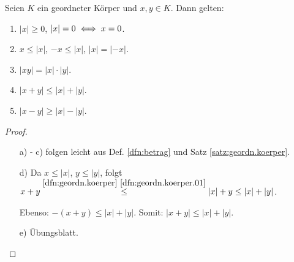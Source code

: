 \documentclass[12pt]{scrreprt}
\begin{document}
\begin{satz}\label{satz:betrag}
Seien $K$ ein geordneter Körper und $x, y \in K$. Dann gelten:

\begin{enumerate} %
\item $|x| \geq 0$, $|x| = 0 \iff x = 0$.
\item $x \leq |x|$, $-x \leq |x|$, $|x| = |-x|$.
\item $|xy| = |x| \cdot |y|$.
\item $|x + y| \leq |x| + |y|$.
\item $|x - y| \geq |x| - |y|$.
\end{enumerate}
\end{satz}

\begin{proof}
\begin{itemize}
\item[] a) - c) folgen leicht aus Def. \ref{dfn:betrag} und Satz \ref{satz:geordn.koerper}.

\item [d)] Da $x \leq |x|$, $y \leq |y|$, folgt $x+y \stackrel{\ref{dfn:geordn.koerper}~\ref{dfn:geordn.koerper.01}}{\leq} |x| + y \leq |x| + |y|$.

Ebenso: $-(x+y) \leq |x|+|y|$. Somit: $|x+y| \leq |x|+|y|$.

\item[e)] Übungsblatt.
\end{itemize}
\end{proof}
\end{document}

